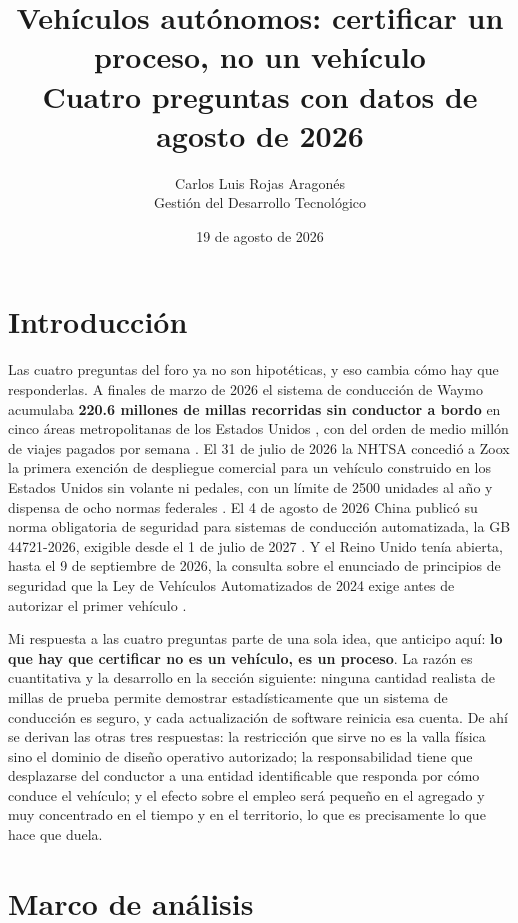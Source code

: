 \documentclass[11pt,letterpaper]{article}
\title{\vspace{-1.2cm}\textbf{Vehículos autónomos: certificar un proceso, no un
vehículo}\\
\large Cuatro preguntas con datos de agosto de 2026}
\author{Carlos Luis Rojas Aragonés\\
\small Gestión del Desarrollo Tecnológico}
\date{\small 19 de agosto de 2026}
\begin{document}
\maketitle
\vspace{-0.6em}

\section{Introducción}

Las cuatro preguntas del foro ya no son hipotéticas, y eso cambia cómo hay que
responderlas. A finales de marzo de 2026 el sistema de conducción de Waymo
acumulaba \textbf{\num{220.6} millones de millas recorridas sin conductor a
bordo} en cinco áreas metropolitanas de los Estados Unidos
\parencite{waymoimpact2026}, con del orden de medio millón de viajes pagados por
semana \parencite{cnbc2025rides}. El 31 de julio de 2026 la NHTSA concedió a Zoox
la primera exención de despliegue comercial para un vehículo construido en los
Estados Unidos sin volante ni pedales, con un límite de \num{2500} unidades al
año y dispensa de ocho normas federales \parencite{fr2026zoox}. El 4 de agosto de
2026 China publicó su norma obligatoria de seguridad para sistemas de conducción
automatizada, la GB 44721-2026, exigible desde el 1 de julio de 2027
\parencite{techtimes2026}. Y el Reino Unido tenía abierta, hasta el 9 de
septiembre de 2026, la consulta sobre el enunciado de principios de seguridad que
la Ley de Vehículos Automatizados de 2024 exige antes de autorizar el primer
vehículo \parencite{dft2026,ukavact2024}.

Mi respuesta a las cuatro preguntas parte de una sola idea, que anticipo aquí:
\textbf{lo que hay que certificar no es un vehículo, es un proceso}. La razón es
cuantitativa y la desarrollo en la sección siguiente: ninguna cantidad realista
de millas de prueba permite demostrar estadísticamente que un sistema de
conducción es seguro, y cada actualización de software reinicia esa cuenta. De
ahí se derivan las otras tres respuestas: la restricción que sirve no es la valla
física sino el dominio de diseño operativo autorizado; la responsabilidad tiene
que desplazarse del conductor a una entidad identificable que responda por cómo
conduce el vehículo; y el efecto sobre el empleo será pequeño en el agregado y
muy concentrado en el tiempo y en el territorio, lo que es precisamente lo que
hace que duela.

\section{Marco de análisis}
\end{document}

